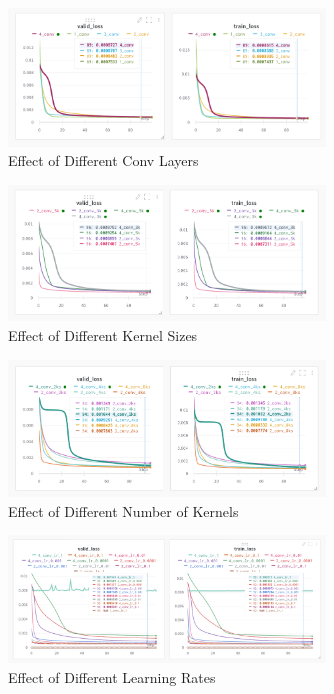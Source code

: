 \documentclass[12pt]{article}
\begin{document}
    \begin{figure}[!htb]
        \centering
        \includegraphics[width=0.75\textwidth]{figures/conv_layers.png}
        \caption{Effect of Different Conv Layers}
        \label{fig:conv_layers}
    \end{figure}

    \begin{figure}[!htb]
        \centering
        \includegraphics[width=0.75\textwidth]{figures/conv_kernels.png}
        \caption{Effect of Different Kernel Sizes}
        \label{fig:conv_kernels}
    \end{figure}

    \begin{figure}[!htb]
        \centering
        \includegraphics[width=0.75\textwidth]{figures/conv_num_kernels.png}
        \caption{Effect of Different Number of Kernels}
        \label{fig:conv_num_kernels}
    \end{figure}

    \begin{figure}[!htb]
        \centering
        \includegraphics[width=0.75\textwidth]{figures/learning_rate/conv_lr.png}
        \caption{Effect of Different Learning Rates}
        \label{fig:conv_lr}
    \end{figure}
\end{document}
